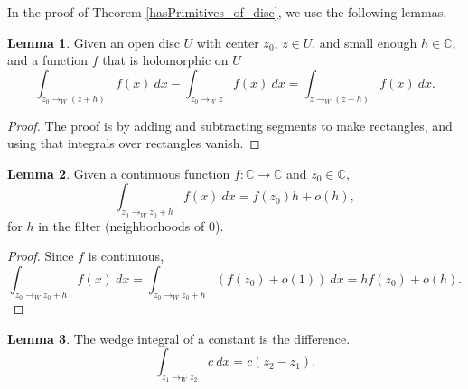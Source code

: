\documentclass{report}
\theoremstyle{definition}
\newtheorem{lemma}{Lemma}
\begin{document}
In the proof of Theorem \ref{hasPrimitives_of_disc}, we use the following lemmas.

\begin{lemma}
  \label{diff_of_wedges}
  \leanok
  Given an open disc $U$ with center $z_0$, $z\in U$, and small enough $h\in \mathbb C$, and a function $f$ that is holomorphic on $U$
  \begin{equation}
    \int_{z_0\to_W (z+h)} f(x)\ dx
    -
    \int_{z_0\to_W z} f(x)\ dx
    =
    \int_{z\to_W (z+h)} f(x)\ dx
    .
  \end{equation}
\end{lemma}

\begin{proof}
  The proof is by adding and subtracting segments to make rectangles, and using that integrals over rectangles vanish.
\end{proof}

\begin{lemma}
  \label{deriv_of_wedgeInt}
  Given a continuous function $f:\mathbb C\to\mathbb C$ and $z_0\in\mathbb C$,
  \begin{equation}
    \int_{z_0\to_W z_0+h}f(x)\ dx = f(z_0)h + o(h)
    ,
  \end{equation}
  for $h$ in the filter (neighborhoods of $0$).
\end{lemma}

\begin{proof}
  Since $f$ is continuous,
  \begin{equation}
    \int_{z_0\to_W z_0+h}f(x)\ dx
    =
    \int_{z_0\to_W z_0+h}(f(z_0)+o(1))\ dx
    =
    hf(z_0)+o(h)
    .
  \end{equation}
\end{proof}

\begin{lemma}
  \label{wedgeInt_of_const}
  The wedge integral of a constant is the difference.
\begin{equation}
  \int_{z_1\to_W z_2} c\ dx
  =
  c(z_2-z_1)
  .
\end{equation}
\end{lemma}
\end{document}
